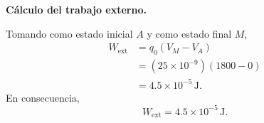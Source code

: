\documentclass[11pt]{article}
\begin{document}
\textbf{C\'alculo del trabajo externo.}

Tomando como estado inicial $A$ y como estado final $M$,
\begin{align*}
    W_{\text{ext}}
    &=q_0(V_M-V_A)\\
    &=(25\times 10^{-9})(1800-0)\\
    &=4.5\times 10^{-5}\,\text{J}.
\end{align*}
En consecuencia,
\begin{equation*}
    \boxed{W_{\text{ext}}=4.5\times 10^{-5}\,\text{J}}.
\end{equation*}

\newpage
\end{document}
